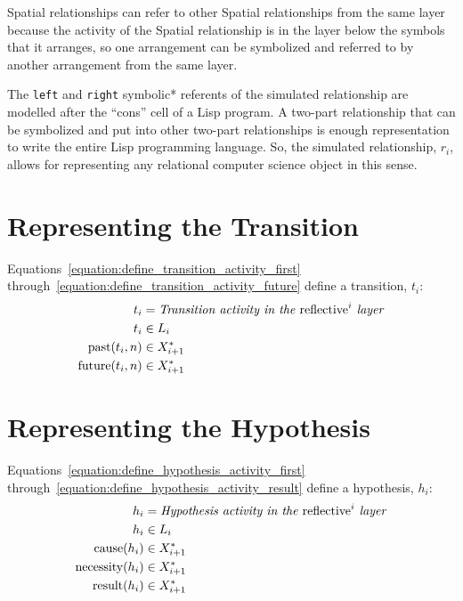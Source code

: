 Spatial relationships can refer to other Spatial relationships from
the same layer because the activity of the Spatial relationship is in
the layer below the symbols that it arranges, so one arrangement can
be symbolized and referred to by another arrangement from the same
layer.

The {\tt left} and {\tt right} symbolic* referents of the simulated
relationship are modelled after the ``cons'' cell of a Lisp program.
A two-part relationship that can be symbolized and put into other
two-part relationships is enough representation to write the entire
Lisp programming language.  So, the simulated relationship, $r_i$,
allows for representing any relational computer science object in this
sense.

\section{Representing the Transition}

Equations~\ref{equation:define_transition_activity_first}
through~\ref{equation:define_transition_activity_future} define a
transition, $t_i$:
\begin{align}
\label{equation:define_transition_activity_first}
               t_i &= \text{\emph{Transition activity in the} reflective}^i\text{\emph{ layer}} \\
               t_i &\in L_i \\
\label{equation:define_transition_activity_past}
  \text{past}(t_i, n) &\in X_{i+1}^* \\
\label{equation:define_transition_activity_future}
\text{future}(t_i, n) &\in X_{i+1}^*
\end{align}

\section{Representing the Hypothesis}

Equations~\ref{equation:define_hypothesis_activity_first}
through~\ref{equation:define_hypothesis_activity_result} define a
hypothesis, $h_i$:
\begin{align}
\label{equation:define_hypothesis_activity_first}
                  h_i &= \text{\emph{Hypothesis activity in the} reflective}^i\text{\emph{ layer}} \\
                  h_i &\in L_i \\
\label{equation:define_hypothesis_activity_cause}
    \text{cause}(h_i) &\in X_{i+1}^* \\
\label{equation:define_hypothesis_activity_necessity}
\text{necessity}(h_i) &\in X_{i+1}^* \\
\label{equation:define_hypothesis_activity_result}
   \text{result}(h_i) &\in X_{i+1}^*
\end{align}

